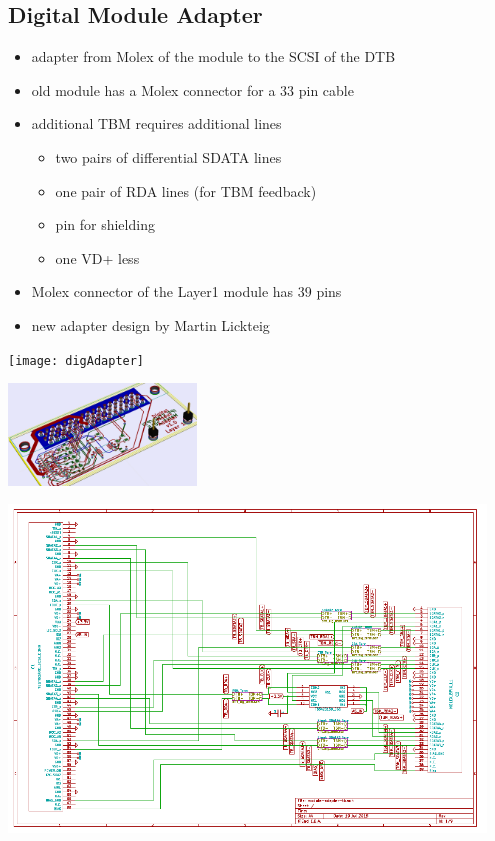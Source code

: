 \documentclass[9pt]{beamer}
\begin{document}
\subsection{Digital Module Adapter}
\begin{frame}
	\begin{itemize}
		\setlength{\itemsep}{\fill}
		\item adapter from Molex of the module to the SCSI of the DTB
		\item old module has a Molex connector for a $33$ pin cable
		\item additional TBM requires additional lines
		\begin{itemize}
			\item two pairs of differential SDATA lines
			\item one pair of RDA lines (for TBM feedback)
			\item pin for shielding
			\item one VD+ less
		\end{itemize}
		\item Molex connector of the Layer1 module has $39$ pins
		\item new adapter design by Martin Lickteig
	\end{itemize}
	\begin{minipage}{5.5cm}
		\centering
		\texttt{[image: digAdapter]}
	\end{minipage}
	\hspace*{2pt}
	\begin{minipage}{5.5cm}
		\centering
		\includegraphics[width=5cm]{digAdapter3D}
	\end{minipage}
\end{frame}
\begin{frame}
	\begin{center}
		\includegraphics[width=0.95\textwidth]{connector}
	\end{center}
\end{frame}
\end{document}
